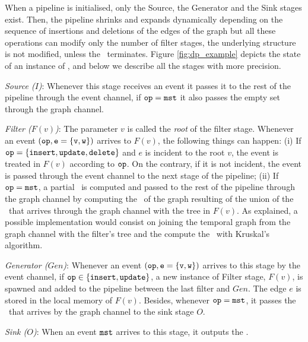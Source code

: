 When a pipeline is initialised, only the Source, the Generator and the Sink stages exist. Then, the pipeline shrinks and expands dynamically depending on the sequence of insertions and deletions of the edges of the graph but all these operations can modify only the number of filter stages, the underlying structure is not modified, unless the \DPmst\ terminates. Figure \ref{fig:dp_example} depicts the state of an instance of \DPmst, and below we describe all the stages with more precision.

\emph{Source ($I$)}: Whenever this stage receives an event it passes 
        it to the rest of the pipeline through the event channel, if ${\tt op} ={\tt mst}$
        it also passes the empty set through the graph channel.

\emph{Filter ($F(v)$)}: The parameter $v$ is called the \emph{root} of the 
        filter stage. Whenever an event $({\tt op,e=\{v,w\})}$ arrives to $F(v)$, the following things
        can happen:  (i) If ${\tt op}=\{{\tt insert, update, delete}\}$ and $e$ is incident to
        the root $v$, the event is treated in $F(v)$ according to ${\tt op}$. On the contrary, if it is not incident, the event is passed through the event channel to the next
        stage of the pipeline; (ii) If ${\tt op}={\tt mst}$,  a partial \mst\ is computed and
        passed to the rest of the pipeline through the graph channel by 
        computing the \mst\ of the graph resulting of the union of the 
        \mst\ that arrives through the graph channel with the tree in $F(v)$. As explained, a possible implementation would consist on joining the temporal graph from the graph channel with the filter's tree and the compute the \mst\ with Kruskal's algorithm.
        
\emph{Generator ($Gen$)}: Whenever an event $({\tt op,e=\{v,w\}})$ arrives to this stage  
        by the event channel, if ${\tt op}\in\{{\tt insert, update}\}$, a new instance of
        Filter stage, $F(v)$, is spawned and added to the pipeline 
        between the last filter and $Gen$. The edge $e$ is stored in the local memory of $F(v)$. Besides, whenever 
        ${\tt op}={\tt mst}$, it passes the \mst\ that arrives by the graph channel 
        to the sink stage $O$.
        
\emph{Sink ($O$)}: When an event ${\tt mst}$ arrives to this stage, it outputs the .

